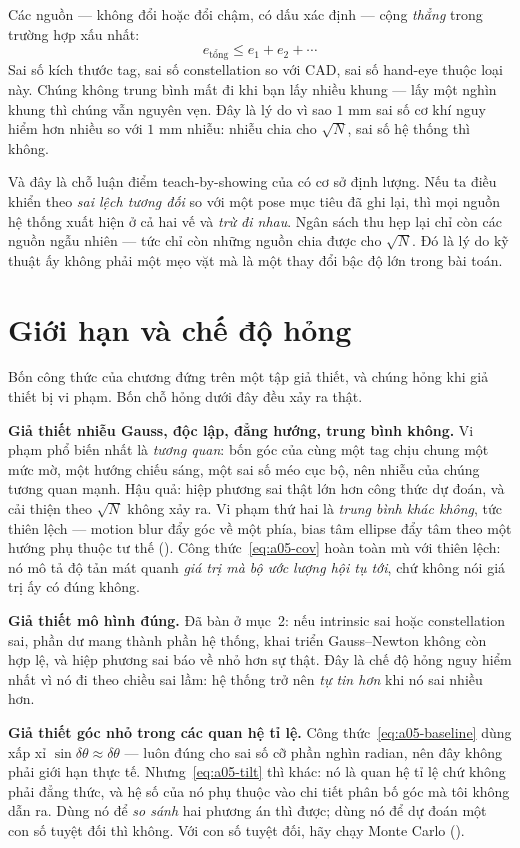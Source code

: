 \documentclass[../../marker.tex]{subfiles}
\begin{document}
Các nguồn  --- không đổi hoặc đổi chậm, có dấu xác định --- cộng \emph{thẳng} trong trường hợp xấu nhất:
\[
e_{\text{tổng}} \le e_1 + e_2 + \cdots
\]
Sai số kích thước tag, sai số constellation so với CAD, sai số hand-eye thuộc loại này. Chúng không trung bình mất đi khi bạn lấy nhiều khung --- lấy một nghìn khung thì chúng vẫn nguyên vẹn. Đây là lý do vì sao \(1\) mm sai số cơ khí nguy hiểm hơn nhiều so với \(1\) mm nhiễu: nhiễu chia cho \(\sqrt{N}\), sai số hệ thống thì không.

Và đây là chỗ luận điểm teach-by-showing của  có cơ sở định lượng. Nếu ta điều khiển theo \emph{sai lệch tương đối} so với một pose mục tiêu đã ghi lại, thì mọi nguồn hệ thống xuất hiện ở cả hai vế và \emph{trừ đi nhau}. Ngân sách thu hẹp lại chỉ còn các nguồn ngẫu nhiên --- tức chỉ còn những nguồn chia được cho \(\sqrt{N}\). Đó là lý do kỹ thuật ấy không phải một mẹo vặt mà là một thay đổi bậc độ lớn trong bài toán.

\section{Giới hạn và chế độ hỏng}

Bốn công thức của chương đứng trên một tập giả thiết, và chúng hỏng khi giả thiết bị vi phạm. Bốn chỗ hỏng dưới đây đều xảy ra thật.

\textbf{Giả thiết nhiễu Gauss, độc lập, đẳng hướng, trung bình không.} Vi phạm phổ biến nhất là \emph{tương quan}: bốn góc của cùng một tag chịu chung một mức mờ, một hướng chiếu sáng, một sai số méo cục bộ, nên nhiễu của chúng tương quan mạnh. Hậu quả: hiệp phương sai thật lớn hơn công thức dự đoán, và cải thiện theo \(\sqrt{N}\) không xảy ra. Vi phạm thứ hai là \emph{trung bình khác không}, tức thiên lệch --- motion blur đẩy góc về một phía, bias tâm ellipse đẩy tâm theo một hướng phụ thuộc tư thế (). Công thức~\eqref{eq:a05-cov} hoàn toàn mù với thiên lệch: nó mô tả độ tản mát quanh \emph{giá trị mà bộ ước lượng hội tụ tới}, chứ không nói giá trị ấy có đúng không.

\textbf{Giả thiết mô hình đúng.} Đã bàn ở mục~2: nếu intrinsic sai hoặc constellation sai, phần dư mang thành phần hệ thống, khai triển Gauss--Newton không còn hợp lệ, và hiệp phương sai báo về nhỏ hơn sự thật. Đây là chế độ hỏng nguy hiểm nhất vì nó đi theo chiều sai lầm: hệ thống trở nên \emph{tự tin hơn} khi nó sai nhiều hơn.

\textbf{Giả thiết góc nhỏ trong các quan hệ tỉ lệ.} Công thức~\eqref{eq:a05-baseline} dùng xấp xỉ \(\sin\delta\theta \approx \delta\theta\) --- luôn đúng cho sai số cỡ phần nghìn radian, nên đây không phải giới hạn thực tế. Nhưng~\eqref{eq:a05-tilt} thì khác: nó là quan hệ tỉ lệ chứ không phải đẳng thức, và hệ số của nó phụ thuộc vào chi tiết phân bố góc mà tôi không dẫn ra. Dùng nó để \emph{so sánh} hai phương án thì được; dùng nó để dự đoán một con số tuyệt đối thì không. Với con số tuyệt đối, hãy chạy Monte Carlo ().
\end{document}
